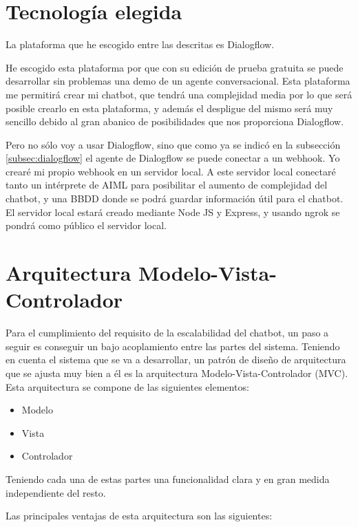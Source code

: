 \section{Tecnología elegida}

La plataforma que he escogido entre las descritas es Dialogflow.

He escogido esta plataforma por que con su edición de prueba gratuita se puede desarrollar sin problemas una demo de un agente conversacional. Esta plataforma me permitirá crear mi chatbot, que tendrá una complejidad media por lo que será posible crearlo en esta plataforma, y además el despligue del mismo será muy sencillo debido al gran abanico de posibilidades que nos proporciona Dialogflow.

Pero no sólo voy a usar Dialogflow, sino que como ya se indicó en la subsección \ref{subsec:dialogflow} el agente de Dialogflow se puede conectar a un webhook. Yo crearé mi propio webhook en un servidor local. A este servidor local conectaré tanto un intérprete de AIML para posibilitar el aumento de complejidad del chatbot, y una BBDD donde se podrá guardar información útil para el chatbot. El servidor local estará creado mediante Node JS y Express, y usando ngrok se pondrá como público el servidor local.


\section{Arquitectura Modelo-Vista-Controlador}

Para el cumplimiento del requisito de la escalabilidad del chatbot, un paso a seguir es conseguir un bajo acoplamiento entre las partes del sistema. Teniendo en cuenta el sistema que se va a desarrollar, un patrón de diseño de arquitectura que se ajusta muy bien a él es la arquitectura Modelo-Vista-Controlador (MVC). Esta arquitectura se compone de las siguientes elementos:

\begin{itemize}
    \item Modelo
    \item Vista
    \item Controlador
\end{itemize}

Teniendo cada una de estas partes una funcionalidad clara y en gran medida independiente del resto. 

Las principales ventajas de esta arquitectura son las siguientes:

